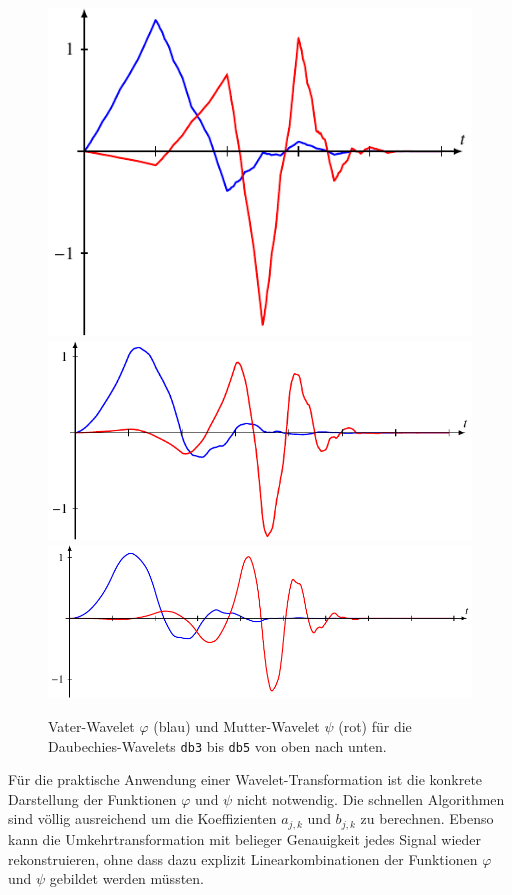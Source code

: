 \begin{figure}
\includegraphics{chapters/7-algo/images/db3.pdf}\\
\includegraphics{chapters/7-algo/images/db4.pdf}\\
\includegraphics{chapters/7-algo/images/db5.pdf}
\caption{Vater-Wavelet $\varphi$ (blau) und Mutter-Wavelet $\psi$
(rot) für die Daubechies-Wavelets \texttt{db3} bis \texttt{db5}
von oben nach unten.
\label{buch:algo:db2}}
\end{figure}%
Für die praktische Anwendung einer Wavelet-Transformation ist
die konkrete Darstellung der Funktionen $\varphi$ und $\psi$
nicht notwendig.
Die schnellen Algorithmen sind völlig ausreichend um die
Koeffizienten $a_{j,k}$ und $b_{j,k}$ zu berechnen.
Ebenso kann die Umkehrtransformation mit belieger Genauigkeit
jedes Signal wieder rekonstruieren, ohne dass dazu explizit 
Linearkombinationen der Funktionen $\varphi$ und $\psi$ gebildet
werden müssten.


